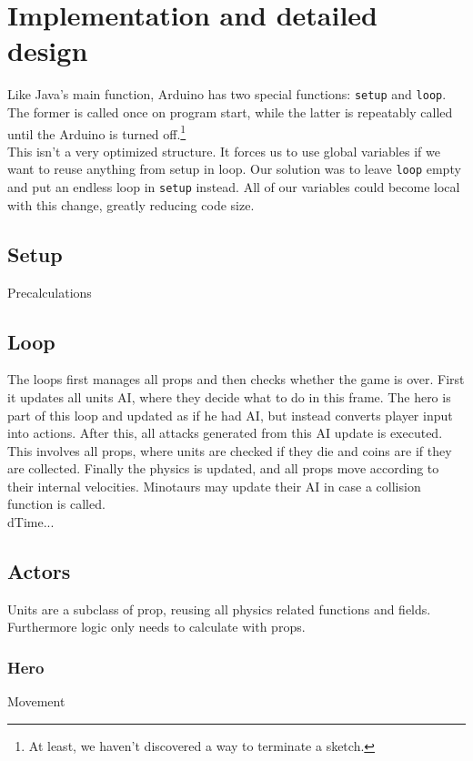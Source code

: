 \chapter{Implementation and detailed design} %
Like Java's main function, Arduino has two special functions:
{\tt setup} and {\tt loop}. The former is called once on program start,
while the latter is repeatably called
until the Arduino is turned off.\footnote{At least, we haven't discovered a way
to terminate a sketch.}\\ This isn't a very optimized structure. It forces us
to use global variables if we want to reuse anything from setup in loop. Our
solution was to leave {\tt loop} empty and put an endless loop in {\tt setup}
instead. All of our variables could become local with this change, greatly
reducing code size.\\ \section{Setup} Precalculations \section{Loop} %
The loops first manages all props and then checks whether the game is over.
First it updates all units AI, where they decide what to do in this frame. The
hero is part of this loop and updated as if he had AI, but instead converts
player input into actions. After this, all attacks generated from this AI
update is executed. This involves all props, where units are checked if they
die and coins are if they are collected. Finally the physics is updated, and
all props move according to their internal velocities. Minotaurs may update
their AI in case a collision function is called.\\ dTime...

\section{Actors} Units are a subclass of prop, reusing all physics related
functions and fields. Furthermore logic only needs to calculate with props.

\subsection{Hero} Movement

